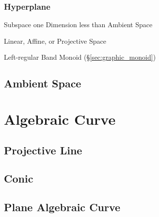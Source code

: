 \subsubsection{Hyperplane}\label{sec:hyperplane}

Subspace one Dimension less than Ambient Space

Linear, Affine, or Projective Space %

Left-regular Band Monoid (\S\ref{sec:graphic_monoid})



\subsection{Ambient Space}\label{sec:ambient_space}




\section{Algebraic Curve}\label{sec:algebraic_curve}


\subsection{Projective Line}\label{sec:projective_line}

\subsection{Conic}\label{sec:conic}

\subsection{Plane Algebraic Curve}\label{sec:plane_algebraic_curve}

